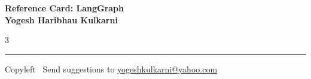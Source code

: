 \documentclass[8pt,landscape]{article}
\begin{document}
\footnotesize


\begin{center}
\Large{\textbf{Reference Card: LangGraph\\ Yogesh Haribhau Kulkarni}}  
\end{center}

% 
\begin{multicols}{3}

\end{multicols}

\rule{\linewidth}{0.25pt}
\scriptsize
Copyleft \textcopyleft\  Send suggestions to 
\href{http://www.yogeshkulkarni.com}{yogeshkulkarni@yahoo.com}
\end{document}
